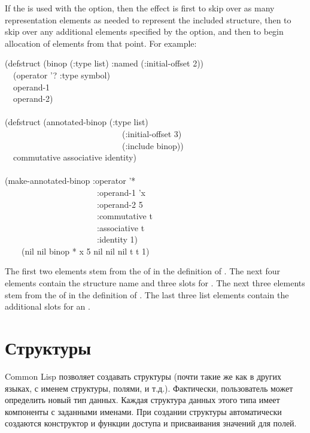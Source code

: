 If the  is used with the 
option, then the effect is first to skip over as many representation
elements as needed to represent the included structure, then to
skip over any additional elements specified by the 
option, and then to begin allocation of elements from that point.
For example:
\begin{lisp}
(defstruct (binop (:type list) :named (:initial-offset 2)) \\
~~(operator '? :type symbol) \\
~~operand-1 \\
~~operand-2) \\
 \\
(defstruct (annotated-binop (:type list) \\
~~~~~~~~~~~~~~~~~~~~~~~~~~~~(:initial-offset 3) \\
~~~~~~~~~~~~~~~~~~~~~~~~~~~~(:include binop)) \\
~~commutative associative identity) \\
 \\
(make-annotated-binop :operator '* \\
~~~~~~~~~~~~~~~~~~~~~~:operand-1 'x \\
~~~~~~~~~~~~~~~~~~~~~~:operand-2 5 \\
~~~~~~~~~~~~~~~~~~~~~~:commutative t \\
~~~~~~~~~~~~~~~~~~~~~~:associative t \\
~~~~~~~~~~~~~~~~~~~~~~:identity 1) \\
~~~\EV\ (nil nil binop * x 5 nil nil nil t t 1)
\end{lisp}
The first two {\nil} elements stem from the  of 
in the definition of .  The next four elements contain the
structure name and three slots for .  The next three {\nil} elements
stem from the  of  in the definition of
.  The last three list elements contain the additional
slots for an .

\else

\chapter{Структуры}

Common Lisp позволяет создавать структуры (почти такие же как в
других языках, с именем структуры, полями, и т.д.). Фактически,
пользователь может определить новый тип данных. Каждая структура данных
этого типа имеет компоненты с заданными именами. При создании
структуры автоматически создаются конструктор и функции доступа и
присваивания значений для полей.


